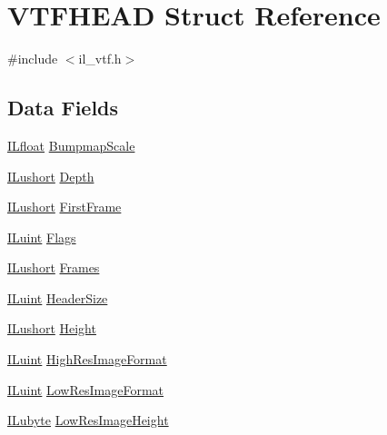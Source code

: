 \hypertarget{struct_v_t_f_h_e_a_d}{\section{V\-T\-F\-H\-E\-A\-D Struct Reference}
\label{struct_v_t_f_h_e_a_d}
}


{\ttfamily \#include $<$il\-\_\-vtf.\-h$>$}

\subsection*{Data Fields}
\begin{DoxyCompactItemize}
\item 
\hyperlink{il_8h_a0576415379485bafa4b5f61989797b5e}{I\-Lfloat} \hyperlink{struct_v_t_f_h_e_a_d_adce6fb8b0858c989a5576712bbd3f891}{Bumpmap\-Scale}
\item 
\hyperlink{il_8h_af6287b43748354a7c4864da43ae56962}{I\-Lushort} \hyperlink{struct_v_t_f_h_e_a_d_aae1f3fb764b6596264cb5a751c12b104}{Depth}
\item 
\hyperlink{il_8h_af6287b43748354a7c4864da43ae56962}{I\-Lushort} \hyperlink{struct_v_t_f_h_e_a_d_afdfa82c38f39510797602523114ef230}{First\-Frame}
\item 
\hyperlink{il_8h_ac6508d0e9c19e32f32e00d54b5b8cf30}{I\-Luint} \hyperlink{struct_v_t_f_h_e_a_d_ad5c4db01d6ffdff05862b7052afa79fc}{Flags}
\item 
\hyperlink{il_8h_af6287b43748354a7c4864da43ae56962}{I\-Lushort} \hyperlink{struct_v_t_f_h_e_a_d_a238f3c32baf1b2b1a0a1fa567431e70c}{Frames}
\item 
\hyperlink{il_8h_ac6508d0e9c19e32f32e00d54b5b8cf30}{I\-Luint} \hyperlink{struct_v_t_f_h_e_a_d_a9f6557e51cfc4ac65955403557bc0e0e}{Header\-Size}
\item 
\hyperlink{il_8h_af6287b43748354a7c4864da43ae56962}{I\-Lushort} \hyperlink{struct_v_t_f_h_e_a_d_ab74e2bb7cc7272180be796817440ae4e}{Height}
\item 
\hyperlink{il_8h_ac6508d0e9c19e32f32e00d54b5b8cf30}{I\-Luint} \hyperlink{struct_v_t_f_h_e_a_d_a800a07dd1ae34b8f9847e77a69678a50}{High\-Res\-Image\-Format}
\item 
\hyperlink{il_8h_ac6508d0e9c19e32f32e00d54b5b8cf30}{I\-Luint} \hyperlink{struct_v_t_f_h_e_a_d_a8a53d4b409cb2e264a5385f0de53084d}{Low\-Res\-Image\-Format}
\item 
\hyperlink{il_8h_a8d2f04500100a86d1b00e98ab1b15a33}{I\-Lubyte} \hyperlink{struct_v_t_f_h_e_a_d_a909042e6cd3bb9e0ddcacd3022fa6d74}{Low\-Res\-Image\-Height}

\end{DoxyCompactItemize}
